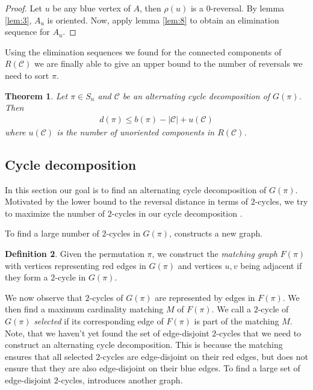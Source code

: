 \documentclass[11pt,DIV=11]{scrartcl}
\newtheorem{theorem}{Theorem}[section]
\theoremstyle{definition}
\newtheorem{definition}[theorem]{Definition}
\theoremstyle{remark}
\begin{document}
\begin{proof}
Let $u$ be any blue vertex of $A$, then $\rho(u)$ is a $0$-reversal. By lemma \ref{lem:3}, $A_u$ is oriented.
Now, apply lemma \ref{lem:8} to obtain an elimination sequence for $A_u$.
\end{proof}

Using the elimination sequences we found for the connected components of $R(\mathcal{C})$ we are finally able to give an upper bound to the number of reversals we need to sort $\pi$.

\begin{theorem}
\label{thm:4}
Let $\pi \in S_n$ and $\mathcal{C}$ be an alternating cycle decomposition of $G(\pi)$. Then
\begin{align*}
    d(\pi) \leq b(\pi) - |\mathcal{C}| + u(\mathcal{C})
\end{align*}
where $u(\mathcal{C})$ is the number of unoriented components in $R(\mathcal{C})$.
\end{theorem}

\subsection{Cycle decomposition}
\label{sec:cycle_decomposition}

In this section our goal is to find an alternating cycle decomposition of $G(\pi)$. Motivated by the lower bound to the reversal distance in terms of $2$-cycles, we try to maximize the number of $2$-cycles in our cycle decomposition \cite{Christie1998}.

To find a large number of $2$-cycles in $G(\pi)$, \citeauthor*{Christie1998} constructs a new graph.

\begin{definition}
Given the permutation $\pi$, we construct the \textit{matching graph} $F(\pi)$ with vertices representing red edges in $G(\pi)$ and vertices $u, v$ being adjacent if they form a $2$-cycle in $G(\pi)$.
\end{definition}

We now observe that $2$-cycles of $G(\pi)$ are represented by edges in $F(\pi)$. We then find a maximum cardinality matching $M$ of $F(\pi)$. We call a $2$-cycle of $G(\pi)$ \textit{selected} if its corresponding edge of $F(\pi)$ is part of the matching $M$. Note, that we haven't yet found the set of edge-disjoint $2$-cycles that we need to construct an alternating cycle decomposition. This is because the matching ensures that all selected $2$-cycles are edge-disjoint on their red edges, but does not ensure that they are also edge-disjoint on their blue edges. To find a large set of edge-disjoint $2$-cycles, \citeauthor*{Christie1998} introduces another graph.
\end{document}

